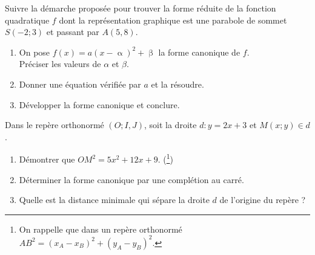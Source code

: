\documentclass[main.tex]{subfiles}
\begin{document}
\vfill
\begin{exercise}  
	 Suivre la démarche proposée pour trouver la forme réduite de la fonction quadratique $f$ dont la représentation graphique est une parabole de sommet $S(-2;3)$ et passant par $A(5,8)$.
	\begin{enumerate}[label=\alph*), leftmargin=*]
		\item On pose $f(x)=a(x-\upalpha)^2+\upbeta$ la forme canonique de $f$.\\
		Préciser les valeurs de $\alpha$ et $\beta$.
		\item Donner une équation vérifiée par $a$ et la résoudre.
		\item Développer la forme canonique et conclure.
	\end{enumerate} 
	\end{exercise} 
\vfill
\begin{problem} 
\noindent Dans le repère orthonormé $(O; I,J)$, soit la droite $d\colon y = 2x+3$ et $M(x;y)\in d$.
\begin{enumerate}[label=\alph*), leftmargin=*]
		\item Démontrer que $OM^2= 5x^2 + 12x + 9$. (\footnote{On rappelle que dans un repère orthonormé $AB^2 = (x_A-x_B)^2+(y_A-y_B)^2$.})
		\item Déterminer la forme canonique par une complétion au carré.
		\item Quelle est la distance minimale qui sépare la droite $d$ de l'origine du repère ?
	\end{enumerate} 
\end{problem}
 
%	 
\end{document}
